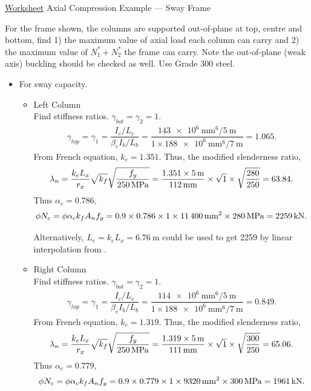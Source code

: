 \begin{exmp}\href{run:./WORKSHEET/CH04/EX4.ACSF.sm}{Worksheet}
Axial Compression Example --- Sway Frame

For the frame shown, the columns are supported out-of-plane at top, centre and bottom, find 1) the maximum value of axial load each column can carry and 2) the maximum value of $N^*_1+N^*_2$ the frame can carry. Note the out-of-plane (weak axis) buckling should be checked as well. Use Grade 300 steel.
\begin{figure}[H]

\end{figure}
\end{exmp}
\begin{solution}
\begin{itemize}
\item For sway capacity.

\begin{itemize}
\item Left Column\\
Find stiffness ratios. $\gamma_{bot}=\gamma_2=1$.
\begin{gather*}
\gamma_{top}=\gamma_1=\dfrac{I_c/L_c}{\beta_eI_b/L_b}=\dfrac{\SI{143e6}{\mm^6}/\SI{5}{\meter}}{1\times\SI{188e6}{\mm^6}/\SI{7}{\meter}}=1.065.
\end{gather*}
From French equation, $k_e=1.351$. Thus, the modified slenderness ratio,
\begin{gather*}
\lambda_n=\dfrac{k_eL_x}{r_x}\sqrt{k_f}\sqrt{\dfrac{f_y}{\SI{250}{\mega\pascal}}}=\dfrac{1.351\times\SI{5}{\meter}}{\SI{112}{\milli\meter}}\times\sqrt{1}\times\sqrt{\dfrac{280}{250}}=63.84.
\end{gather*}
Thus $\alpha_c=0.786$,
\begin{gather*}
\phi{}N_c=\phi\alpha_ck_fA_nf_y=0.9\times0.786\times1\times\SI{11400}{\milli\meter^2}\times\SI{280}{\mega\pascal}=\SI{2259}{\kilo\newton}.
\end{gather*}

Alternatively, $L_e=k_eL_x=\SI{6.76}{\m}$ could be used to get \SI{2259}{\kn} by linear interpolation from .
\item Right Column\\
Find stiffness ratios. $\gamma_{bot}=\gamma_2=1$.
\begin{gather*}
\gamma_{top}=\gamma_1=\dfrac{I_c/L_c}{\beta_eI_b/L_b}=\dfrac{\SI{114e6}{\mm^6}/\SI{5}{\meter}}{1\times\SI{188e6}{\mm^6}/\SI{7}{\meter}}=0.849.
\end{gather*}
From French equation, $k_e=1.319$. Thus, the modified slenderness ratio,
\begin{gather*}
\lambda_n=\dfrac{k_eL_x}{r_x}\sqrt{k_f}\sqrt{\dfrac{f_y}{\SI{250}{\mega\pascal}}}=\dfrac{1.319\times\SI{5}{\meter}}{\SI{111}{\milli\meter}}\times\sqrt{1}\times\sqrt{\dfrac{300}{250}}=65.06.
\end{gather*}
Thus $\alpha_c=0.779$,
\begin{gather*}
\phi{}N_c=\phi\alpha_ck_fA_nf_y=0.9\times0.779\times1\times\SI{9320}{\milli\meter^2}\times\SI{300}{\mega\pascal}=\SI{1961}{\kilo\newton}.
\end{gather*}


\end{itemize}
\end{itemize}
\end{solution}
